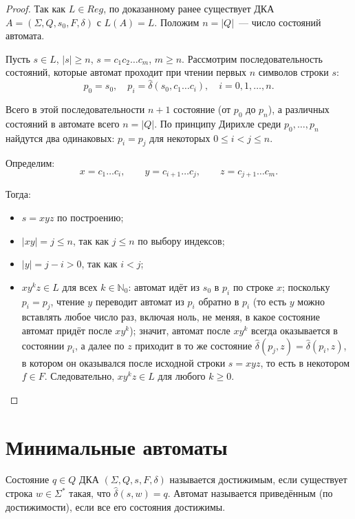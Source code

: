 \documentclass[12pt]{article}
\begin{document}
	\begin{proof}
		Так как $L \in Reg$, по доказанному ранее существует ДКА $A = (\Sigma, Q, s_0, F, \delta)$ с $L(A) = L$. Положим $n = |Q|$~--- число состояний автомата.
		
		Пусть $s \in L$, $|s| \geqslant n$, $s = c_1 c_2 \ldots c_m$, $m \geqslant n$. Рассмотрим последовательность состояний, которые автомат проходит при чтении первых $n$ символов строки $s$:
		\[
		p_0 = s_0,\quad p_i = \hat\delta(s_0, c_1 \ldots c_i),\quad i = 0, 1, \ldots, n.
		\]
		
		Всего в этой последовательности $n + 1$ состояние (от $p_0$ до $p_n$), а различных состояний в автомате всего $n = |Q|$. По принципу Дирихле среди $p_0, \ldots, p_n$ найдутся два одинаковых: $p_i = p_j$ для некоторых $0 \leqslant i < j \leqslant n$.
		
		Определим:
		\[
		x = c_1 \ldots c_i, \qquad y = c_{i+1} \ldots c_j, \qquad z = c_{j+1} \ldots c_m.
		\]
		
		Тогда:
		\begin{itemize}
			\item $s = xyz$ по построению;
			\item $|xy| = j \leqslant n$, так как $j \leqslant n$ по выбору индексов;
			\item $|y| = j - i > 0$, так как $i < j$;
			\item $xy^k z \in L$ для всех $k \in \mathbb{N}_0$: автомат идёт из $s_0$ в $p_i$ по строке $x$; поскольку $p_i = p_j$, чтение $y$ переводит автомат из $p_i$ обратно в $p_i$ (то есть $y$ можно вставлять любое число раз, включая ноль, не меняя, в какое состояние автомат придёт после $x y^k$); значит, автомат после $xy^k$ всегда оказывается в состоянии $p_i$, а далее по $z$ приходит в то же состояние $\hat\delta(p_j, z) = \hat\delta(p_i, z)$, в котором он оказывался после исходной строки $s = xyz$, то есть в некотором $f \in F$. Следовательно, $xy^k z \in L$ для любого $k \geqslant 0$.
		\end{itemize}
	\end{proof}
	
	\section{Минимальные автоматы}
	
	\begin{definition}
		Состояние $q \in Q$ ДКА $(\Sigma, Q, s, F, \delta)$ называется достижимым, если существует строка $w \in \Sigma^*$ такая, что $\hat\delta(s, w) = q$. Автомат называется приведённым (по достижимости), если все его состояния достижимы.
	\end{definition}
	
\end{document}
